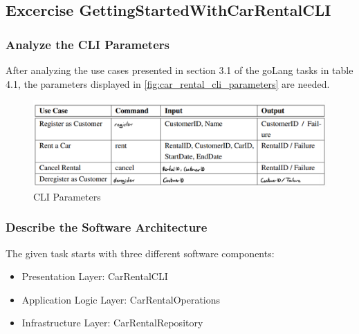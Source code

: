 \subsection{Excercise GettingStartedWithCarRentalCLI}
\label{sec:exercise_getting_started_with_car_rental_cli}
\subsubsection*{Analyze the CLI Parameters}
After analyzing the use cases presented in section 3.1 of the goLang tasks in table 4.1, the parameters displayed in \autoref{fig:car_rental_cli_parameters} are needed.

\begin{figure}[H]
    \centering
    \includegraphics[width=\textwidth]{figures/goLang/carRental/carRental_CLIParameters.png}
    \caption{CLI Parameters}
    \label{fig:car_rental_cli_parameters}
\end{figure}

\subsubsection*{Describe the Software Architecture}
The given task starts with three different software components:
\begin{itemize}
    \item Presentation Layer: CarRentalCLI
    \item Application Logic Layer: CarRentalOperations
    \item Infrastructure Layer: CarRentalRepository
\end{itemize}
